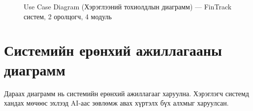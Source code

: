 \begin{figure}[ht]
{
}
\caption{Use Case Diagram (Хэрэглээний тохиолдлын диаграмм) --- FinTrack систем, 2 оролцогч, 4 модуль}
\label{fig:usecase}
\end{figure}

\section{Системийн ерөнхий ажиллагааны диаграмм}
Дараах диаграмм нь системийн ерөнхий ажиллагааг харуулна. Хэрэглэгч системд хандах мөчөөс эхлээд AI-аас зөвлөмж авах хүртэлх бүх алхмыг харуулсан.

